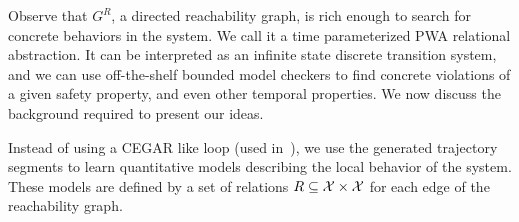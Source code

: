 Observe that $G^R$, a directed reachability graph, is rich enough to
search for concrete behaviors in the system. We call it a time
parameterized PWA relational abstraction. It can be interpreted as an
infinite state discrete transition system, and we can use
off-the-shelf bounded model checkers to find concrete violations of a
given safety property, and even other temporal properties.  We now
discuss the background required to present our ideas.



Instead of using a CEGAR like loop (used in~\cite{zutshi2014multiple}),
we use the generated trajectory segments to learn quantitative models
describing the local behavior of the system. These models are defined
by a set of relations $R \subseteq \mathcal{X} \times \mathcal{X}$
for each edge of the reachability graph.
